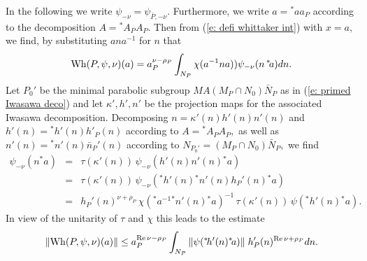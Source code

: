 \documentclass[12pt,a4paper]{article}
\def\Re{{\rm Re}\,}
\numberwithin{Thm}{section}
\numberwithin{equation}{section}
\def\Wh{{\rm Wh}}
\numberwithin{equation}{section}
\def\cchi{\chi}
\begin{document}
In the following we write $\psi_{-\nu} = \psi_{\bar P, -\nu}.$ 
Furthermore, we write $a = {}^*\!a  a_P$ according to the decomposition $A = {}^*\!A_P A_P.$  Then from (\ref{e: defi whittaker int}) with $x =a,$ we find,
by substituting $a n a^{-1}$ for $n$ that
$$ 
 \Wh(P, \psi, \nu)(a) =  a_P^{\nu - \rho_P}\int_{N_P}  \cchi(a^{-1}n a)) \psi_{-\nu}(n \,{}^*\!a ) dn.
$$ 
Let $P_0'$ be the minimal parabolic subgroup $MA (M_P\cap N_0) \bar N_P$ 
as in (\ref{e: primed Iwasawa deco}) and let $\kappa', h', n'$ be the
projection maps for the associated Iwasawa decomposition. Decomposing
$n = \kappa'(n) h'(n) n'(n)$ and $h'(n) = {}^*h'(n) h'_P(n)$ according to $A = {}^*A_P A_P,$ 
as well as $n'(n) = {}^*n'(n) \bar n_P'(n)$ according to $N_{P_0'} = (M_P \cap N_0) \bar N_P,$ 
we find
\begin{eqnarray*}
\psi_{-\nu}(n {}^* a) & =& \tau(\kappa'(n))\, \psi_{-\nu}(h'(n)n'(n){}^*\! a) \\
&=&  \tau(\kappa'(n))\, \psi_{-\nu}({}^*\!h'(n) {}^*\!n'(n) h_P'(n) {}^*\!a)\\
 &=& h_P'(n)^{\nu + \rho_P}\, \cchi({}^*\! a^{-1} {}^*\! n'(n){}^*\! a)^{-1}\,\tau(\kappa'(n))\, \psi({}^*\!h'(n) {}^*\! a).
\end{eqnarray*}
In view of the unitarity of $\tau$ and $\cchi$ this
leads to the estimate
\begin{equation}
\label{e: first estimate Wh pos nu}
\|\Wh(P, \psi, \nu)(a) \|\leq   
a_P^{\Re \nu -\rho_P} 
\int_{N_P} \|\psi({}^*\!h'(n) {}^*\! a)\|\; h_P'(n)^{\Re \nu + \rho_P} dn.
\end{equation}
\end{document}
